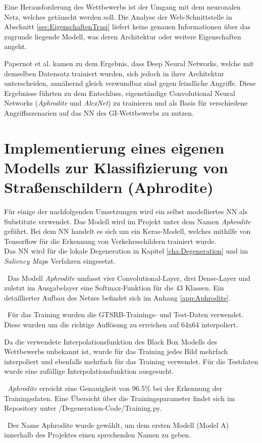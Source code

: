 \label{sec:TrasiModell}
Eine Herausforderung des Wettbewerbs ist der Umgang mit dem neuronalen Netz, welches getäuscht werden soll. Die Analyse der Web-Schnittstelle in Abschnitt \ref{sec:EigenschaftenTrasi} liefert keine genauen Informationen über das zugrunde liegende Modell, was deren Architektur oder weitere Eigenschaften angeht.

Papernot et al. \cite{papernot_+_2016} kamen zu dem Ergebnis, dass Deep Neural Networks, welche mit demselben Datensatz trainiert wurden, sich jedoch in ihrer Architektur unterscheiden, annähernd gleich verwundbar sind gegen feindliche Angriffe. Diese Ergebnisse führten zu dem Entschluss, eigenständige Convolutional Neural Networks (\textit{Aphrodite} und \textit{AlexNet}) zu trainieren und als Basis für verschiedene Angriffsszenarien auf das \ac{NN} des \ac{GI}-Wettbewerbs zu nutzen.


\section{Implementierung eines eigenen Modells zur Klassifizierung von Straßenschildern (Aphrodite)}
\label{sec:ImplAphrodite}
Für einige der nachfolgenden Umsetzungen wird ein selbst modelliertes \ac{NN} als Substitute verwendet. Das Modell wird im Projekt unter dem Namen \textit{Aphrodite} geführt. Bei dem \ac{NN} handelt es sich um ein Keras-Modell, welches mithilfe von Tensorflow für die Erkennung von Verkehrsschildern trainiert wurde. \\
Das \ac{NN} wird für die lokale Degeneration in Kapitel \ref{cha:Degeneration} und im \textit{Saliency Map}s Verfahren eingesetzt.

~\newline Das Modell \textit{Aphrodite} umfasst vier Convolutional-Layer, drei Dense-Layer und zuletzt im Ausgabelayer eine Softmax-Funktion für die 43 Klassen. Ein detaillierter Aufbau des Netzes befindet sich im Anhang \ref{app:Aphrodite}.

~\newline Für das Training wurden die \ac{GTSRB}-Trainings- und Test-Daten verwendet. Diese wurden um die richtige Auflösung zu erreichen auf 64x64 interpoliert. 

Da die verwendete Interpolationsfunktion des Black Box Modells des Wettbewerbs unbekannt ist, wurde für das Training jedes Bild mehrfach interpoliert und ebenfalls mehrfach für das Training verwendet. Für die Testdaten wurde eine zufällige Interpolationsfunktion ausgesucht. 

~\newline \textit{Aphrodite} erreicht eine Genauigkeit von 96.5\% bei der Erkennung der Trainingsdaten. Eine Übersicht über die Trainingsparameter findet sich im Repository unter /Degeneration-Code/Training.py. 

~\newline Der Name Aphrodite wurde gewählt, um dem ersten Modell (Model A) innerhalb des Projektes einen sprechenden Namen zu geben.
